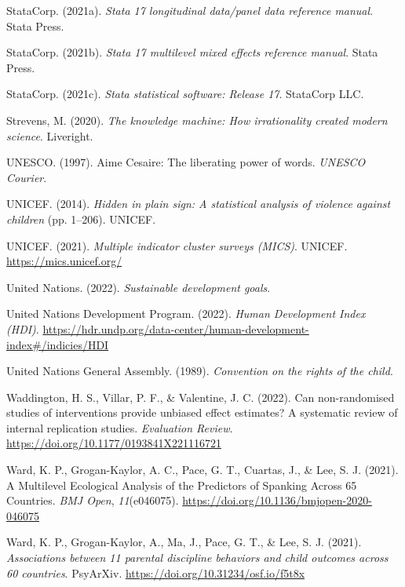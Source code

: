 \documentclass[
  letterpaper,
  DIV=11,
  numbers=noendperiod]{scrreprt}
\newlength{\cslhangindent}
\newenvironment{CSLReferences}[2] %
 {\begin{list}{}{%
  \setlength{\itemindent}{0pt}
  \setlength{\leftmargin}{0pt}
  \setlength{\parsep}{0pt}
  \ifodd #1
   \setlength{\leftmargin}{\cslhangindent}
   \setlength{\itemindent}{-1\cslhangindent}
  \fi
  \setlength{\itemsep}{#2\baselineskip}}}
 {\end{list}}
\begin{document}
\begin{CSLReferences}{1}{0}
StataCorp. (2021a). \emph{Stata 17 longitudinal data/panel data
reference manual}. Stata Press.

StataCorp. (2021b). \emph{Stata 17 multilevel mixed effects reference
manual}. Stata Press.

StataCorp. (2021c). \emph{Stata statistical software: Release 17}.
StataCorp LLC.

Strevens, M. (2020). \emph{The knowledge machine: How irrationality
created modern science}. Liveright.

UNESCO. (1997). {A}ime {C}esaire: The liberating power of words.
\emph{UNESCO Courier}.

UNICEF. (2014). \emph{Hidden in plain sign: A statistical analysis of
violence against children} (pp. 1--206). UNICEF.

UNICEF. (2021). \emph{Multiple indicator cluster surveys (MICS)}.
UNICEF. \url{https://mics.unicef.org/}

United Nations. (2022). \emph{Sustainable development goals}.

United Nations Development Program. (2022). \emph{{Human Development
Index (HDI)}}.
\url{https://hdr.undp.org/data-center/human-development-index\#/indicies/HDI}

United Nations General Assembly. (1989). \emph{Convention on the rights
of the child}.

Waddington, H. S., Villar, P. F., \& Valentine, J. C. (2022). Can
non-randomised studies of interventions provide unbiased effect
estimates? A systematic review of internal replication studies.
\emph{Evaluation Review}.
\url{https://doi.org/10.1177/0193841X221116721}

Ward, K. P., Grogan-Kaylor, A. C., Pace, G. T., Cuartas, J., \& Lee, S.
J. (2021). {A Multilevel Ecological Analysis of the Predictors of
Spanking Across 65 Countries}. \emph{BMJ Open}, \emph{11}(e046075).
\url{https://doi.org/10.1136/bmjopen-2020-046075}

Ward, K. P., Grogan-Kaylor, A., Ma, J., Pace, G. T., \& Lee, S. J.
(2021). \emph{Associations between 11 parental discipline behaviors and
child outcomes across 60 countries}. PsyArXiv.
\url{https://doi.org/10.31234/osf.io/f5t8x}


\end{CSLReferences}
\end{document}
